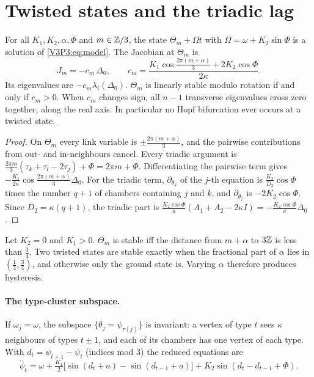 \section{Twisted states and the triadic lag}\label{V3P3:sec:twisted}

\begin{theorem}\label{V3P3:thm:twisted}
For all $K_1,K_2,\alpha,\Phi$ and $m\in\mathbb{Z}/3$, the state $\Theta_m+\Omega t$ with
$\Omega=\omega+K_2\sin\Phi$ is a solution of \eqref{V3P3:eq:model}. The Jacobian at $\Theta_m$ is
\[
J_m=-c_m\,\Delta_0,\qquad
c_m=\frac{K_1\cos\frac{2\pi(m+\alpha)}3+2K_2\cos\Phi}{2\kappa}.
\]
Its eigenvalues are $-c_m\lambda_i(\Delta_0)$. $\Theta_m$ is linearly stable modulo rotation
if and only if $c_m>0$. When $c_m$ changes sign, all $n-1$ transverse eigenvalues cross zero
together, along the real axis. In particular no Hopf bifurcation ever occurs at a twisted
state.
\end{theorem}

\begin{proof}
On $\Theta_m$ every link variable is $\pm\frac{2\pi(m+\alpha)}{3}$, and the pairwise
contributions from out- and in-neighbours cancel. Every triadic argument is
$\frac{2\pi m}{3}(\tau_k+\tau_l-2\tau_j)+\Phi=2\pi m+\Phi$. Differentiating the pairwise term
gives $-\frac{K_1}{2\kappa}\cos\frac{2\pi(m+\alpha)}{3}\Delta_0$. For the triadic term,
$\partial_{\theta_k}$ of the $j$-th equation is $\frac{K_2}{D_2}\cos\Phi$ times the number
$q+1$ of chambers containing $j$ and $k$, and $\partial_{\theta_j}$ is $-2K_2\cos\Phi$. Since
$D_2=\kappa(q+1)$, the triadic part is $\frac{K_2\cos\Phi}{\kappa}(A_1+A_2-2\kappa
I)=-\frac{K_2\cos\Phi}{\kappa}\Delta_0$.
\end{proof}

\begin{corollary}[Multistability]\label{V3P3:cor:bistable}
Let $K_2=0$ and $K_1>0$. $\Theta_m$ is stable iff the distance from $m+\alpha$ to $3\mathbb{Z}$ is less
than $\frac34$. Two twisted states are stable exactly when the fractional part of $\alpha$
lies in $(\frac14,\frac34)$, and otherwise only the ground state is. Varying $\alpha$ therefore
produces hysteresis.
\end{corollary}

\paragraph{The type-cluster subspace.} If $\omega_j=\omega$, the subspace
$\{\theta_j=\psi_{\tau(j)}\}$ is invariant: a vertex of type $t$ sees $\kappa$ neighbours of
types $t\pm1$, and each of its chambers has one vertex of each type. With
$d_t=\psi_{t+1}-\psi_t$ (indices mod $3$) the reduced equations are
\begin{equation}\label{V3P3:eq:cluster}
\dot\psi_t=\omega+\tfrac{K_1}{2}\bigl[\sin(d_t+a)-\sin(d_{t-1}+a)\bigr]+K_2\sin(d_t-d_{t-1}+\Phi).
\end{equation}

